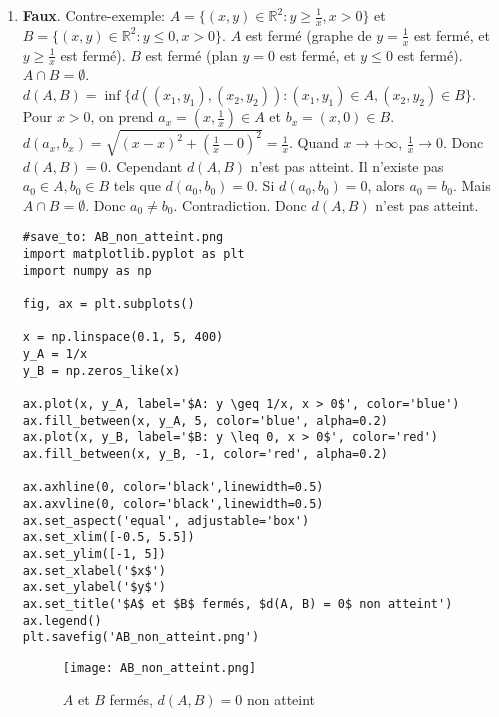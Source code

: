 \documentclass[oneside]{book}
\begin{document}
\begin{solution}
\begin{enumerate}
    \item \textbf{Faux}. Contre-exemple: $A = \{(x, y) \in \mathbb{R}^2 : y \geq \frac{1}{x}, x > 0\}$ et $B = \{(x, y) \in \mathbb{R}^2 : y \leq 0, x > 0\}$.
        $A$ est fermé (graphe de $y = \frac{1}{x}$ est fermé, et $y \geq \frac{1}{x}$ est fermé). $B$ est fermé (plan $y = 0$ est fermé, et $y \leq 0$ est fermé).
        $A \cap B = \emptyset$. $d(A, B) = \inf \{d((x_1, y_1), (x_2, y_2)) : (x_1, y_1) \in A, (x_2, y_2) \in B\}$.
        Pour $x > 0$, on prend $a_x = (x, \frac{1}{x}) \in A$ et $b_x = (x, 0) \in B$.
        $d(a_x, b_x) = \sqrt{(x - x)^2 + (\frac{1}{x} - 0)^2} = \frac{1}{x}$.
        Quand $x \to +\infty$, $\frac{1}{x} \to 0$. Donc $d(A, B) = 0$.
        Cependant $d(A, B)$ n'est pas atteint. Il n'existe pas $a_0 \in A, b_0 \in B$ tels que $d(a_0, b_0) = 0$.
        Si $d(a_0, b_0) = 0$, alors $a_0 = b_0$. Mais $A \cap B = \emptyset$. Donc $a_0 \neq b_0$. Contradiction.
        Donc $d(A, B)$ n'est pas atteint.

        \begin{verbatim}
#save_to: AB_non_atteint.png
import matplotlib.pyplot as plt
import numpy as np

fig, ax = plt.subplots()

x = np.linspace(0.1, 5, 400)
y_A = 1/x
y_B = np.zeros_like(x)

ax.plot(x, y_A, label='$A: y \geq 1/x, x > 0$', color='blue')
ax.fill_between(x, y_A, 5, color='blue', alpha=0.2)
ax.plot(x, y_B, label='$B: y \leq 0, x > 0$', color='red')
ax.fill_between(x, y_B, -1, color='red', alpha=0.2)

ax.axhline(0, color='black',linewidth=0.5)
ax.axvline(0, color='black',linewidth=0.5)
ax.set_aspect('equal', adjustable='box')
ax.set_xlim([-0.5, 5.5])
ax.set_ylim([-1, 5])
ax.set_xlabel('$x$')
ax.set_ylabel('$y$')
ax.set_title('$A$ et $B$ fermés, $d(A, B) = 0$ non atteint')
ax.legend()
plt.savefig('AB_non_atteint.png')
        \end{verbatim}

        \begin{figure}[H]
            \centering
            \texttt{[image: AB\_non\_atteint.png]}
            \caption{$A$ et $B$ fermés, $d(A, B) = 0$ non atteint}
            \label{fig:AB_non_atteint}
        \end{figure}


\end{enumerate}
\end{solution}
\end{document}
